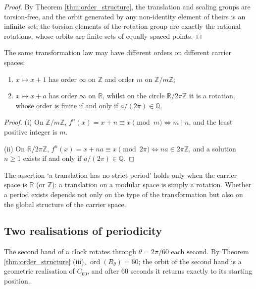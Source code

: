 \begin{proof}
By Theorem \ref{thm:order_structure}, the translation and scaling groups are torsion-free, and the orbit generated by any non-identity element of theirs is an infinite set; the torsion elements of the rotation group are exactly the rational rotations, whose orbits are finite sets of equally spaced points.
\end{proof}

\begin{proposition}\label{prop:carrier_space}
The same transformation law may have different orders on different carrier spaces:
\begin{enumerate}[label=(\roman*)]
    \item $x\mapsto x+1$ has order $\infty$ on $\mathbb{Z}$ and order $m$ on $\mathbb{Z}/m\mathbb{Z}$;
    \item $x\mapsto x+a$ has order $\infty$ on $\mathbb{R}$, whilst on the circle $\mathbb{R}/2\pi\mathbb{Z}$ it is a rotation, whose order is finite if and only if $a/(2\pi)\in\mathbb{Q}$.
\end{enumerate}
\end{proposition}

\begin{proof}
(i) On $\mathbb{Z}/m\mathbb{Z}$, $f^n(x)=x+n\equiv x\pmod m\iff m\mid n$, and the least positive integer is $m$.

(ii) On $\mathbb{R}/2\pi\mathbb{Z}$, $f^n(x)=x+na\equiv x\pmod{2\pi}\iff na\in 2\pi\mathbb{Z}$, and a solution $n\ge 1$ exists if and only if $a/(2\pi)\in\mathbb{Q}$.
\end{proof}

\begin{remark}\label{rem:translation_period_fix}
The assertion `a translation has no strict period' holds only when the carrier space is $\mathbb{R}$ (or $\mathbb{Z}$): a translation on a modular space is simply a rotation. Whether a period exists depends not only on the type of the transformation but also on the global structure of the carrier space.
\end{remark}

\subsection{Two realisations of periodicity}

\begin{example}\label{ex:clock}
The second hand of a clock rotates through $\theta=2\pi/60$ each second. By Theorem \ref{thm:order_structure} (iii), $\operatorname{ord}(R_\theta)=60$; the orbit of the second hand is a geometric realisation of $C_{60}$, and after 60 seconds it returns exactly to its starting position.
\end{example}

